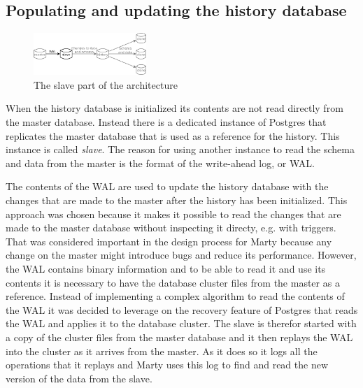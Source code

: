 \subsection{Populating and updating the history database}

\begin{figure}
  \vspace{-20pt}
  \begin{center}
    \includegraphics[width=0.38\textwidth]{img/architecture-slave}
  \end{center}
  \vspace{-20pt}
  \caption{The slave part of the architecture}
  \vspace{-10pt}
\end{figure}

When the history database is initialized its contents are not read directly from the master database.
Instead there is a dedicated instance of Postgres that replicates the master database that is used as a reference for the history.
This instance is called \textit{slave}.
The reason for using another instance to read the schema and data from the master is the format of the write-ahead log, or WAL.

The contents of the WAL are used to update the history database with the changes that are made to the master after the history has been initialized.
This approach was chosen because it makes it possible to read the changes that are made to the master database without inspecting it directy, e.g. with triggers.
That was considered important in the design process for Marty because any change on the master might introduce bugs and reduce its performance.
However, the WAL contains binary information and to be able to read it and use its contents it is necessary to have the database cluster files from the master as a reference.
Instead of implementing a complex algorithm to read the contents of the WAL it was decided to leverage on the recovery feature of Postgres that reads the WAL and applies it to the database cluster.
The slave is therefor started with a copy of the cluster files from the master database and it then replays the WAL into the cluster as it arrives from the master.
As it does so it logs all the operations that it replays and Marty uses this log to find and read the new version of the data from the slave.

